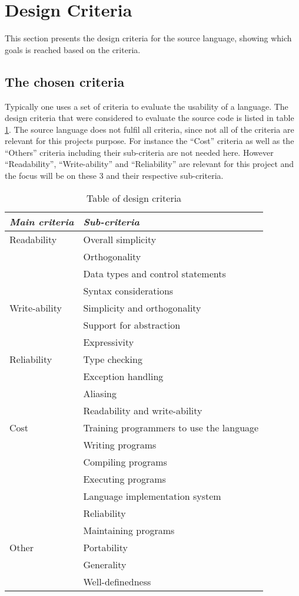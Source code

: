 \chapter{Design Criteria}\label{chap:design-criteria}
This section presents the design criteria for the source language, showing which goals is reached based on the criteria. 

\section{The chosen criteria}
Typically one uses a set of criteria to evaluate the usability of a language. The design criteria that were considered to evaluate the source code is listed in table \ref{chap:design-criteria}. 
The source language does not fulfil all criteria, since not all of the criteria are relevant for this projects purpose. For instance the ``Cost'' criteria as well as the ``Others'' criteria including their sub-criteria are not needed here. However ``Readability'', ``Write-ability'' and ``Reliability'' are relevant for this project and the focus will be on these 3 and their respective sub-criteria.

\begin{table}[H]
	\center
	\begin{tabular}{|l|l|}
	\hline
	\emph{Main criteria} & \emph{Sub-criteria} \\ 
 		\hline
 		Readability & Overall simplicity \\
 		 & Orthogonality \\
 		 & Data types and control statements \\
 		 & Syntax considerations \\
 		\hline
 		Write-ability & Simplicity and orthogonality  \\
 		 & Support for abstraction \\
 		 & Expressivity \\
 		\hline
 		Reliability & Type checking \\
 		 & Exception handling \\
 		 & Aliasing \\
 		 & Readability and write-ability \\
 		\hline
 		Cost & Training programmers to use the language \\
 		 & Writing programs \\
 		 & Compiling programs \\
 		 & Executing programs \\
 		 & Language implementation system \\
 		 & Reliability \\
 		 & Maintaining programs \\
 		\hline
 		Other & Portability \\
 		 & Generality \\
 		 & Well-definedness \\
 		\hline
	\end{tabular}
	\label{tab:design}
	\caption{Table of design criteria}
\end{table} 

